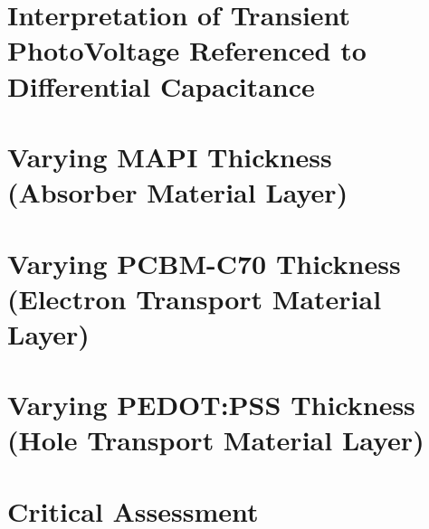 \section{Interpretation of Transient PhotoVoltage Referenced to Differential Capacitance}\label{interpretation_tpvdc}


\section{Varying MAPI Thickness (Absorber Material Layer)}
\section{Varying PCBM-C70 Thickness (Electron Transport Material Layer)}
\section{Varying PEDOT:PSS Thickness (Hole Transport Material Layer)}
\section{Critical Assessment}